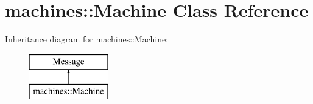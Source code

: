 \hypertarget{classmachines_1_1Machine}{}\section{machines\+:\+:Machine Class Reference}
\label{classmachines_1_1Machine}
Inheritance diagram for machines\+:\+:Machine\+:\begin{figure}[H]
\begin{center}
\leavevmode
\includegraphics[height=2.000000cm]{classmachines_1_1Machine}
\end{center}
\end{figure}
